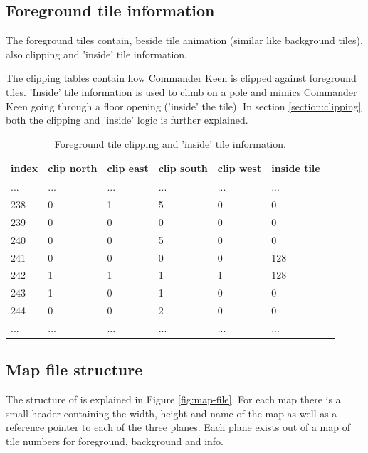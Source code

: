 \documentclass[book.tex]{subfiles}
\begin{document}
\subsection{Foreground tile information}
The foreground tiles contain, beside tile animation (similar like background tiles), also clipping and 'inside' tile information.\\
\par
The clipping tables contain how Commander Keen is clipped against foreground tiles. 'Inside' tile information is used to climb on a pole and mimics Commander Keen going through a floor opening ('inside' the tile). In section \ref{section:clipping} both the clipping and 'inside' logic is further explained.\\
\begin{table}[H]
  \begin{tabularx}{\textwidth}[c]{XXXXXXX}
  \hline
  \textbf{index} & \textbf{clip north} & \textbf{clip east} & \textbf{clip south} & \textbf{clip west}  & \textbf{inside tile} \\ \hline
  ...    & ...     & ...    & ...   & ...     & ...      \\
  238    & 0       & 1      & 5     & 0       & 0        \\
  239    & 0       & 0      & 0     & 0       & 0        \\
  240    & 0       & 0      & 5     & 0       & 0        \\
  241    & 0       & 0      & 0     & 0       & 128       \\
  242    & 1       & 1      & 1     & 1       & 128       \\
  243    & 1       & 0      & 1     & 0       & 0       \\
  244    & 0       & 0      & 2     & 0       & 0       \\
  ...    & ...     & ...    & ...   & ...     & ...     \\
  \end{tabularx}
  \caption{Foreground tile clipping and 'inside' tile information.}
  \end{table}


\pagebreak
 
\subsection{Map file structure}
The structure of  is explained in Figure \ref{fig:map-file}. For each map there is a small header containing the width, height and name of the map as well as a reference pointer to each of the three planes. Each plane exists out of a map of tile numbers for foreground, background and info.\\
\end{document}

